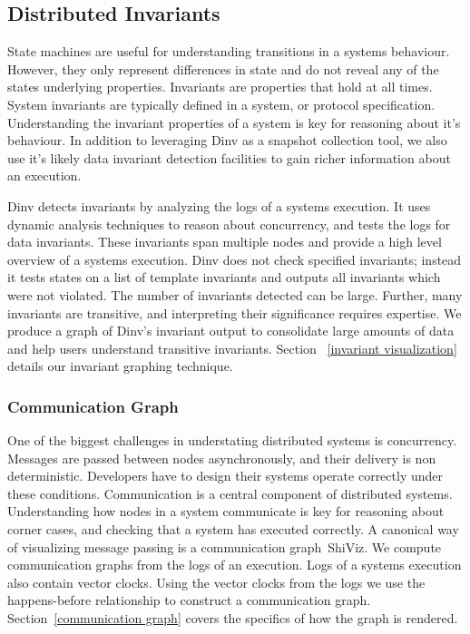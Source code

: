 \subsection{Distributed Invariants}

State machines are useful for understanding transitions in a systems behaviour.
However, they only represent differences in state and do not reveal any of the
states underlying properties. Invariants are properties that hold at all times.
System invariants are typically defined in a system, or protocol specification.
Understanding the invariant properties of a system is key for reasoning about
it's behaviour. In addition to leveraging Dinv as a snapshot collection tool,
we also use it's likely data invariant detection facilities to gain richer information
about an execution.

Dinv detects invariants by analyzing the logs of a systems execution. It uses
dynamic analysis techniques to reason about concurrency, and tests the logs for
data invariants. These invariants span multiple nodes and provide a high level
overview of a systems execution. Dinv does not check specified invariants;
instead it tests states on a list of template  invariants and outputs all
invariants which were not violated. The number of invariants detected can be
large. Further, many invariants are transitive, and interpreting their
significance requires expertise. We produce a graph of Dinv's invariant output
to consolidate large amounts of data and help users understand transitive
invariants. Section ~\ref{invariant visualization} details our invariant
graphing technique.

\subsubsection{Communication Graph}

One of the biggest challenges in understating distributed systems is
concurrency. Messages are passed between nodes asynchronously, and their delivery
is non deterministic. Developers have to design their systems operate correctly
under these conditions. Communication is a central component of distributed
systems. Understanding how nodes in a system communicate is key for reasoning
about corner cases, and checking that a system has executed correctly. A
canonical way of visualizing message passing is a communication
graph~\cite{lamport}{ShiViz}. We compute communication graphs from the logs of
an execution. Logs of a systems execution also contain vector clocks. Using the
vector clocks from the logs we use the happens-before relationship to construct
a communication graph. Section~\ref{communication graph} covers the specifics
of how the graph is rendered.

















